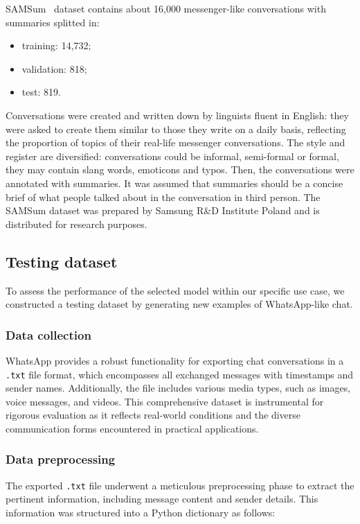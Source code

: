 \documentclass[10pt,twocolumn,letterpaper]{article}
\begin{document}
SAMSum~\cite{DBLP:journals/corr/abs-1911-12237} dataset contains about 16,000 messenger-like conversations with summaries splitted in:
\begin{itemize}
    \item training: 14,732;
    \item validation: 818;
    \item test: 819.
\end{itemize}
Conversations were created and written down by linguists fluent in English: they were asked to create them similar to those they write on a daily basis, reflecting the proportion of topics of their real-life messenger conversations. 
The style and register are diversified: conversations could be informal, semi-formal or formal, 
they may contain slang words, emoticons and typos. Then, the conversations were annotated with summaries. 
It was assumed that summaries should be a concise brief of what people talked about in the conversation in third person. 
The SAMSum dataset was prepared by Samsung R\&D Institute Poland and is distributed for research purposes.

\subsection{Testing dataset}
To assess the performance of the selected model within our specific use case, we constructed a testing dataset by generating new examples of WhatsApp-like chat.

\subsubsection{Data collection}

\hspace{1em}WhatsApp provides a robust functionality for exporting chat conversations in a \texttt{.txt} file format, which encompasses all exchanged messages with timestamps and sender names. 
Additionally, the file includes various media types, such as images, voice messages, and videos. 
This comprehensive dataset is instrumental for rigorous evaluation as it reflects real-world conditions and the diverse communication forms encountered in practical applications.

\subsubsection{Data preprocessing}

\hspace{1em}The exported \texttt{.txt} file underwent a meticulous preprocessing phase to extract the pertinent information, including message content and sender details. 
This information was structured into a Python dictionary as follows:
\end{document}
